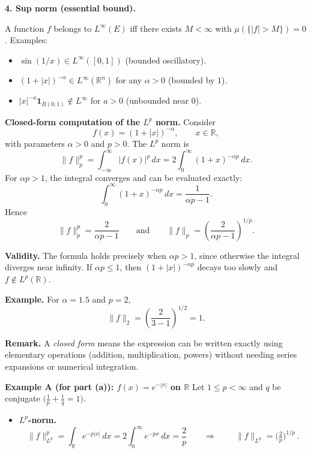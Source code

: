 \begin{problem}[CP-III-0010]
	\bigskip
	\textbf{4. Sup norm (essential bound).}

	\medskip
	A function $f$ belongs to $L^\infty(E)$ iff there exists $M<\infty$ with
	$\mu(\{|f|>M\})=0$.
	Examples:
	\begin{itemize}
		\item $\sin(1/x)\in L^\infty([0,1])$ (bounded oscillatory).
		\item $(1+|x|)^{-\alpha}\in L^\infty(\mathbb{R}^n)$ for any $\alpha>0$ (bounded by $1$).
		\item $|x|^{-a}\mathbf 1_{B(0,1)}\notin L^\infty$ for $a>0$ (unbounded near $0$).
	\end{itemize}


\par\smallskip\noindent\textbf{Closed-form computation of the $L^p$ norm.}\quad
Consider
\[
f(x) = (1 + |x|)^{-\alpha}, \qquad x \in \mathbb{R},
\]
with parameters $\alpha>0$ and $p>0$.
The $L^p$ norm is
\[
\|f\|_p^p
= \int_{-\infty}^{\infty} |f(x)|^p\,dx
= 2\int_0^\infty (1+x)^{-\alpha p}\,dx.
\]
For $\alpha p > 1$, the integral converges and can be evaluated exactly:
\[
\int_0^\infty (1+x)^{-\alpha p}\,dx
= \frac{1}{\alpha p - 1}.
\]
Hence
\[
\boxed{\|f\|_p^p = \frac{2}{\alpha p - 1}}
\qquad\text{and}\qquad
\boxed{\|f\|_p = \left(\frac{2}{\alpha p - 1}\right)^{1/p}}.
\]

\par\smallskip\noindent\textbf{Validity.}\quad
The formula holds precisely when $\alpha p > 1$, since otherwise the integral diverges near infinity.
If $\alpha p \le 1$, then $(1+|x|)^{-\alpha p}$ decays too slowly and
$f \notin L^p(\mathbb{R})$.

\par\smallskip\noindent\textbf{Example.}\quad
For $\alpha = 1.5$ and $p = 2$,
\[
\|f\|_2 = \left(\frac{2}{3 - 1}\right)^{1/2} = 1.
\]

\par\smallskip\noindent\textbf{Remark.}\quad
A \emph{closed form} means the expression can be written exactly using
elementary operations (addition, multiplication, powers) without needing
series expansions or numerical integration.


\clearpage

\par\medskip\noindent\textbf{Example A (for part (a)): \boldmath $f(x)=e^{-|x|}$ on $\mathbb{R}$}\quad
Let $1\le p<\infty$ and $q$ be conjugate $\bigl(\tfrac1p+\tfrac1q=1\bigr)$.
\begin{itemize}
	\item \textbf{$L^p$-norm.}
	\[
	\|f\|_{L^p}^p
	= \int_{\mathbb{R}} e^{-p|x|}\,dx
	= 2\!\int_0^\infty e^{-px}\,dx
	= \frac{2}{p}
	\qquad\Longrightarrow\qquad
	\boxed{\ \|f\|_{L^p} = \bigl(\tfrac{2}{p}\bigr)^{1/p}\ }.
	\]


\end{itemize}
\end{problem}
